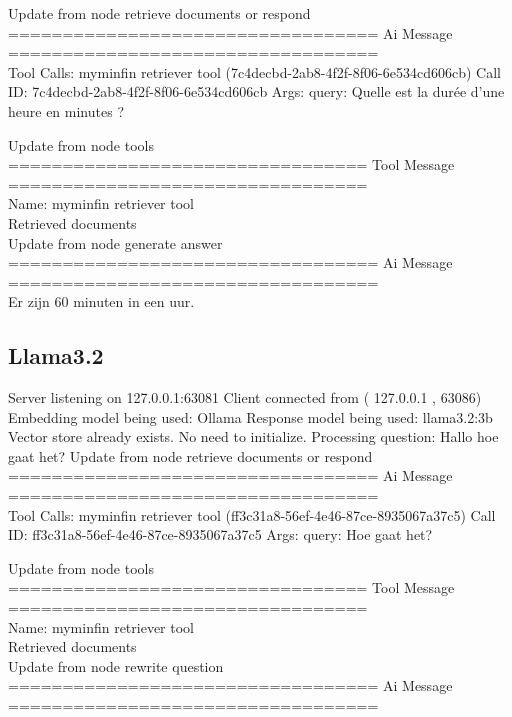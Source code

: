 Update from node retrieve documents or respond
\\[1em]
================================== Ai Message ==================================
\\[1em]
Tool Calls:
myminfin retriever tool (7c4decbd-2ab8-4f2f-8f06-6e534cd606cb)
Call ID: 7c4decbd-2ab8-4f2f-8f06-6e534cd606cb
Args:
query: Quelle est la durée d’une heure en minutes ?


Update from node tools
\\[1em]
================================= Tool Message =================================
\\[1em]
Name: myminfin retriever tool
\\[1em]
Retrieved documents
\\[1em]

Update from node generate answer
\\[1em]
================================== Ai Message ==================================
\\[1em]
Er zijn 60 minuten in een uur.



\subsection{Llama3.2}
Server listening on 127.0.0.1:63081
Client connected from ( 127.0.0.1 , 63086)
Embedding model being used: Ollama
Response model being used: llama3.2:3b
Vector store already exists. No need to initialize.
Processing question: Hallo hoe gaat het?
Update from node retrieve  documents  or  respond
\\[1em]
================================== Ai Message ==================================
\\[1em]
Tool Calls:
myminfin  retriever  tool (ff3c31a8-56ef-4e46-87ce-8935067a37c5)
Call ID: ff3c31a8-56ef-4e46-87ce-8935067a37c5
Args:
query: Hoe gaat het?



Update from node tools
\\[1em]
================================= Tool Message =================================
\\[1em]
Name: myminfin  retriever  tool
\\[1em]
Retrieved documents
\\[1em]

Update from node rewrite  question
\\[1em]
================================== Ai Message ==================================
\\[1em]

